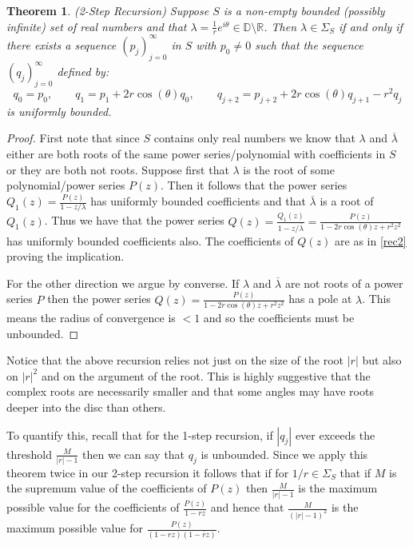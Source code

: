 \documentclass[11pt]{amsart}
\newtheorem{theorem}{Theorem}
\numberwithin{theorem}{section} %
\numberwithin{corollary}{section}
\numberwithin{lemma}{section}
\numberwithin{proposition}{section}
\numberwithin{definition}{section}
\begin{document}
\begin{theorem}(2-Step Recursion)
\label{2-step}
Suppose $S$ is a non-empty bounded (possibly infinite) set of real numbers and that $\lambda = \frac{1}{r}e^{i\theta} \in \mathbb{D} \setminus \mathbb{R}$. Then $\lambda \in \Sigma_S$ if and only if there exists a sequence $(p_j)_{j=0}^\infty$ in $S$ with $p_0 \neq 0$ such that the sequence $(q_j)_{j=0}^\infty$ defined by:
\begin{equation} \label{rec2}
	q_0 = p_0, \qquad q_1 = p_1 + 2r\cos(\theta) q_0, \qquad q_{j+2} = p_{j+2} + 2r\cos(\theta)q_{j+1} - r^2q_j
\end{equation}
is uniformly bounded.
\end{theorem}

\begin{proof}
First note that since $S$ contains only real numbers we know that $\lambda$ and $\overline{\lambda}$ either are both roots of the same power series/polynomial with coefficients in $S$ or they are both not roots. Suppose first that $\lambda$ is the root of some polynomial/power series $P(z)$. Then it follows that the power series $Q_1(z) = \frac{P(z)}{1-z/\lambda}$ has uniformly bounded coefficients and that $\overline{\lambda}$ is a root of $Q_1(z)$. Thus we have that the power series $Q(z) = \frac{Q_1(z)}{1-z/\overline{\lambda}} = \frac{P(z)}{1-2r\cos(\theta)z + r^2z^2}$ has uniformly bounded coefficients also. The coefficients of $Q(z)$ are as in \eqref{rec2} proving the implication.

\vspace{10pt}

For the other direction we argue by converse. If $\lambda$ and $\overline{\lambda}$ are not roots of a power series $P$ then the power series $Q(z) = \frac{P(z)}{1-2r\cos(\theta)z + r^2z^2}$ has a pole at $\lambda$. This means the radius of convergence is $< 1$ and so the coefficients must be unbounded.

\end{proof}

Notice that the above recursion relies not just on the size of the root $|r|$ but also on $|r|^2$ and on the argument of the root. This is highly suggestive that the complex roots are necessarily smaller and that some angles may have roots deeper into the disc than others.

To quantify this, recall that for the 1-step recursion, if $|q_j|$ ever exceeds the threshold $\frac{M}{|r|-1}$ then we can say that $q_j$ is unbounded. Since we apply this theorem twice in our 2-step recursion it follows that if for $1/r \in \Sigma_S$ that if $M$ is the supremum value of the coefficients of $P(z)$ then $\frac{M}{|r|-1}$ is the maximum possible value for the coefficients of $\frac{P(z)}{1-rz}$ and hence that $\frac{M}{(|r|-1)^2}$ is the maximum possible value for $\frac{P(z)}{(1-rz)(1-\overline{r}z)}$.
\end{document}
